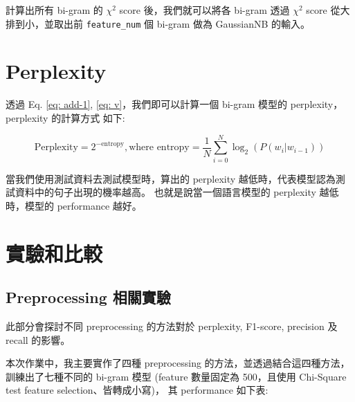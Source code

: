 \documentclass{article}[12pt]
\begin{document}
計算出所有 bi-gram 的 $\chi^2$ score 後，我們就可以將各 bi-gram 透過 $\chi^2$ score 從大
排到小，並取出前 \texttt{feature\_num} 個 bi-gram 做為 GaussianNB 的輸入。

\section{Perplexity}
透過 Eq. \ref{eq: add-1}, \ref{eq: v}，我們即可以計算一個 bi-gram 模型的 perplexity，perplexity 的計算方式
如下:

\begin{equation}
    \text{Perplexity} = 2^{-\text{entropy}}, \text{where entropy} = \frac{1}{N} \sum^{N}_{i=0} \log_{2}(P(w_i|w_{i-1}))
\end{equation}

當我們使用測試資料去測試模型時，算出的 perplexity 越低時，代表模型認為測試資料中的句子出現的機率越高。
也就是說當一個語言模型的 perplexity 越低時，模型的 performance 越好。

\section{實驗和比較}

\subsection{Preprocessing 相關實驗}
此部分會探討不同 preprocessing 的方法對於 perplexity, F1-score, precision 及 recall
的影響。

本次作業中，我主要實作了四種 preprocessing 的方法，並透過結合這四種方法，訓練出了七種不同的 bi-gram 模型 
(feature 數量固定為 500，且使用 Chi-Square test feature selection、皆轉成小寫)，
其 performance 如下表:
\end{document}
